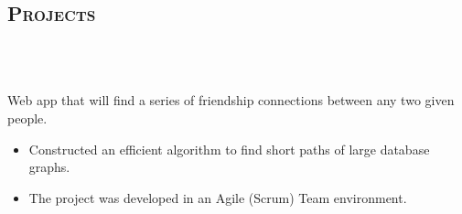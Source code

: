 \begin{resume}
\section{\textsc{Projects}}


\begin{formatb}
  \\
  \body\\
\end{formatb}

\begin{position}
  Web app that will find a series of friendship connections between any two given people. 
\end{position}
\begin{itemize}
\item Constructed an efficient algorithm to find short paths of large database graphs.
\end{itemize}
\begin{itemize}
\item The project was developed in an Agile (Scrum) Team environment.
\end{itemize}



\end{resume}

